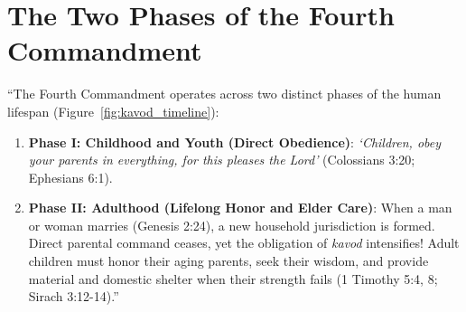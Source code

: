 \documentclass[11pt]{report}
\begin{document}
\section{The Two Phases of the Fourth Commandment}
``The Fourth Commandment operates across two distinct phases of the human lifespan (Figure~\ref{fig:kavod_timeline}):
\begin{enumerate}
    \item \textbf{Phase I: Childhood and Youth (Direct Obedience)}: \textit{`Children, obey your parents in everything, for this pleases the Lord'} (Colossians 3:20; Ephesians 6:1).
    \item \textbf{Phase II: Adulthood (Lifelong Honor and Elder Care)}: When a man or woman marries (Genesis 2:24), a new household jurisdiction is formed. Direct parental command ceases, yet the obligation of \textit{kavod} intensifies! Adult children must honor their aging parents, seek their wisdom, and provide material and domestic shelter when their strength fails (1 Timothy 5:4, 8; Sirach 3:12-14).''
\end{enumerate}
\end{document}
